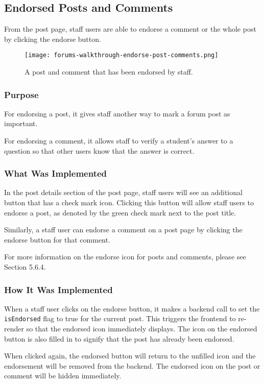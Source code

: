 \newpage

\subsection{Endorsed Posts and Comments}
From the post page, staff users are able to endorse a comment or the whole post by clicking the endorse button.

\begin{figure}[h!]
    \texttt{[image: forums-walkthrough-endorse-post-comments.png]}
    \centering
    \caption{A post and comment that has been endorsed by staff.}
\end{figure}

\subsubsection{Purpose}
For endorsing a post, it gives staff another way to mark a forum post as important.

For endorsing a comment, it allows staff to verify a student's answer to a question so that other users know that the answer is correct.

\subsubsection{What Was Implemented}
In the post details section of the post page, staff users will see an additional button that has a check mark icon.
Clicking this button will allow staff users to endorse a post, as denoted by the green check mark next to the post title.

Similarly, a staff user can endorse a comment on a post page by clicking the endorse button for that comment.

For more information on the endorse icon for posts and comments, please see Section 5.6.4.

\subsubsection{How It Was Implemented}
When a staff user clicks on the endorse button, it makes a backend call to set the \texttt{isEndorsed} flag to true for the current post.
This triggers the frontend to re-render so that the endorsed icon immediately displays.
The icon on the endorsed button is also filled in to signify that the post has already been endorsed.

When clicked again, the endorsed button will return to the unfilled icon and the endorsement will be removed from the backend.
The endorsed icon on the post or comment will be hidden immediately.

